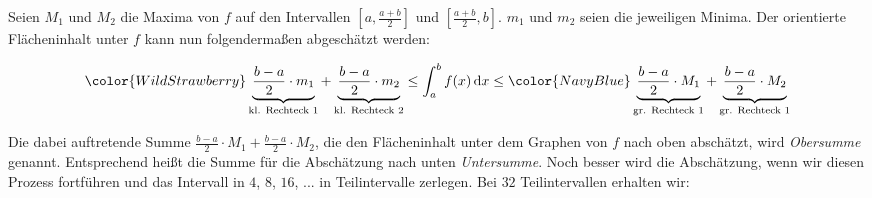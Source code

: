 \documentclass[fontsize=9pt,
               parskip=half-,
               DIV=14,
               listof=chapterentry,
               tocflat]{scrbook}
\begin{document}
Seien $M_{1}$ und $M_{2}$ die Maxima von $f$ auf den Intervallen $\left[a,{\tfrac {a+b}{2}}\right]$ und $\left[{\tfrac {a+b}{2}},b\right]$. $m_{1}$ und $m_{2}$ seien die jeweiligen Minima. Der orientierte Flächeninhalt unter $f$ kann nun folgendermaßen abgeschätzt werden:

\begin{align*}
{\color {WildStrawberry}\underbrace {{\frac {b-a}{2}}\cdot m_{1}} _{\text{kl. Rechteck 1}}+\underbrace {{\frac {b-a}{2}}\cdot m_{2}} _{\text{kl. Rechteck 2}}}\leq \int _{a}^{b}f(x)\,\mathrm {d} x\leq {\color {NavyBlue}\underbrace {{\frac {b-a}{2}}\cdot M_{1}} _{\text{gr. Rechteck 1}}+\underbrace {{\frac {b-a}{2}}\cdot M_{2}} _{\text{gr. Rechteck 1}}}
\end{align*}

Die dabei auftretende Summe ${\tfrac {b-a}{2}}\cdot M_{1}+{\tfrac {b-a}{2}}\cdot M_{2}$, die den Flächeninhalt unter dem Graphen von $f$ nach oben abschätzt, wird \emph{Obersumme} genannt. Entsprechend heißt die Summe für die Abschätzung nach unten \emph{Untersumme}. Noch besser wird die Abschätzung, wenn wir diesen Prozess fortführen und das Intervall in $4$, $8$, $16$, ... in Teilintervalle zerlegen. Bei $32$ Teilintervallen erhalten wir:
\end{document}
